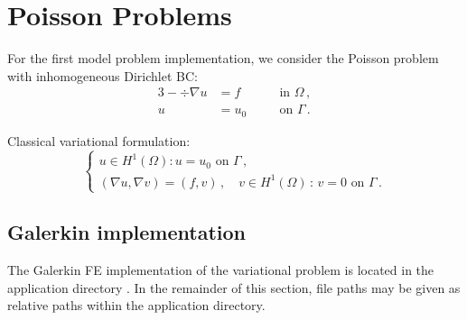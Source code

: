 %
%


\section{Poisson Problems}
\label{sec:poisson}

For the first model problem implementation, we consider the Poisson problem with inhomogeneous Dirichlet BC:
\begin{alignat*}{3}
	- \div \nabla u &= f && \quad \text{in } \Omega \, , \\
	u &= u_0 && \quad \text{on } \Gamma \, .
\end{alignat*}

Classical variational formulation:
\[
\left\{
\begin{array}{llll}
	u \in H^1(\Omega):  u = u_0 \text{ on } \Gamma \, , \\[5pt]
	(\nabla u, \nabla v) = (f,v) \, ,
	\quad v \in H^1(\Omega) \, : \, v = 0 \text{ on } \Gamma \, .
\end{array}
\right.
\]

\subsection{Galerkin implementation}
\label{sec:poisson-galerkin}

The Galerkin FE implementation of the variational problem is located in the application directory . In the remainder of this section, file paths may be given as relative paths within the application directory.

